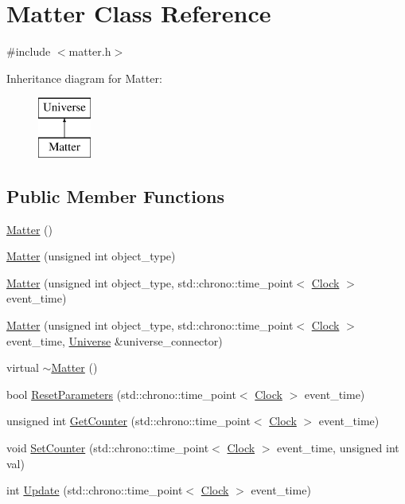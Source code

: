 \hypertarget{classMatter}{}\section{Matter Class Reference}
\label{classMatter}


{\ttfamily \#include $<$matter.\+h$>$}

Inheritance diagram for Matter\+:\begin{figure}[H]
\begin{center}
\leavevmode
\includegraphics[height=2.000000cm]{classMatter}
\end{center}
\end{figure}
\subsection*{Public Member Functions}
\begin{DoxyCompactItemize}
\item 
\mbox{\hyperlink{classMatter_ac2dc2f5eeef03d3bdf41a68334ae49b4}{Matter}} ()
\item 
\mbox{\hyperlink{classMatter_a7e2328c2a17dcc7b57af59d1d5c9ea96}{Matter}} (unsigned int object\+\_\+type)
\item 
\mbox{\hyperlink{classMatter_ae15b0b8d811fb2ffd01ea039777d1b95}{Matter}} (unsigned int object\+\_\+type, std\+::chrono\+::time\+\_\+point$<$ \mbox{\hyperlink{universe_8h_a0ef8d951d1ca5ab3cfaf7ab4c7a6fd80}{Clock}} $>$ event\+\_\+time)
\item 
\mbox{\hyperlink{classMatter_a724543a0439d3099f5fc0eae68110b75}{Matter}} (unsigned int object\+\_\+type, std\+::chrono\+::time\+\_\+point$<$ \mbox{\hyperlink{universe_8h_a0ef8d951d1ca5ab3cfaf7ab4c7a6fd80}{Clock}} $>$ event\+\_\+time, \mbox{\hyperlink{classUniverse}{Universe}} \&universe\+\_\+connector)
\item 
virtual \mbox{\hyperlink{classMatter_a646fca3d4176950aed6173e1378664e3}{$\sim$\+Matter}} ()
\item 
bool \mbox{\hyperlink{classMatter_adfd93d323e43d09fa8d8b7cdd2258611}{Reset\+Parameters}} (std\+::chrono\+::time\+\_\+point$<$ \mbox{\hyperlink{universe_8h_a0ef8d951d1ca5ab3cfaf7ab4c7a6fd80}{Clock}} $>$ event\+\_\+time)
\item 
unsigned int \mbox{\hyperlink{classMatter_ac667a2f3b6d5d2ce8469efe1596cdd62}{Get\+Counter}} (std\+::chrono\+::time\+\_\+point$<$ \mbox{\hyperlink{universe_8h_a0ef8d951d1ca5ab3cfaf7ab4c7a6fd80}{Clock}} $>$ event\+\_\+time)
\item 
void \mbox{\hyperlink{classMatter_a514b4a64589eb3fbc3db6b3b356bd687}{Set\+Counter}} (std\+::chrono\+::time\+\_\+point$<$ \mbox{\hyperlink{universe_8h_a0ef8d951d1ca5ab3cfaf7ab4c7a6fd80}{Clock}} $>$ event\+\_\+time, unsigned int val)
\item 
int \mbox{\hyperlink{classMatter_a56898dd51e5a675832bc82de285b3ef7}{Update}} (std\+::chrono\+::time\+\_\+point$<$ \mbox{\hyperlink{universe_8h_a0ef8d951d1ca5ab3cfaf7ab4c7a6fd80}{Clock}} $>$ event\+\_\+time)
\end{DoxyCompactItemize}
